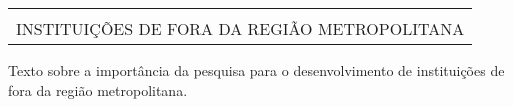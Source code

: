\begin{longtable}[c]{l}
\hline
\rowcolor[HTML]{C0C0C0} 
\multicolumn{1}{|m{16.6cm}|}{\cellcolor[HTML]{C0C0C0}\textbf{\begin{tabular}[c]{@{}l@{}}
XVIII. IMPORTÂNCIA DA PESQUISA PARA O DESENVOLVIMENTO DE \\
INSTITUIÇÕES DE FORA DA REGIÃO METROPOLITANA
\end{tabular}}} \\ \hline
\endfirsthead
%
\endhead
%
\end{longtable}

Texto sobre a importância da pesquisa para o desenvolvimento de instituições de fora da região metropolitana.